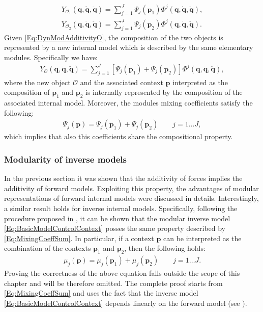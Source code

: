 \documentclass{svmult}
\begin{document}
\begin{eqnarray} \label{Eq:DynModAdditivityComb}
Y_{\mathcal O_1}(\mathbf q, \dot{\mathbf q}, \ddot{\mathbf q}) = 
\sum_{j=1}^J \Psi_j(\mathbf p_1) \Phi^j(\mathbf q, \dot{\mathbf q},\ddot{\mathbf q}),\\
Y_{\mathcal O_2}(\mathbf q, \dot{\mathbf q}, \ddot{\mathbf q}) = 
\sum_{j=1}^J \Psi_j(\mathbf p_2) \Phi^j(\mathbf q, \dot{\mathbf q},
\ddot{\mathbf q}).
\end{eqnarray}
Given \eqref{Eq:DynModAdditivityO},
the composition of the two objects is represented by a new internal 
model which is described by the same elementary modules. Specifically  
we have:
\begin{eqnarray}
Y_{\mathcal O}(\mathbf q, \dot{\mathbf q}, \ddot{\mathbf q}) = 
\sum_{j=1}^J \left[\Psi_j(\mathbf p_1) + \Psi_j(\mathbf p_2) \right] \Phi^j(\mathbf q, \dot{\mathbf q},\ddot{\mathbf q}),
\end{eqnarray}
where the new object $\mathcal O$ and the associated context $\mathbf p$
interpreted as the composition of $\mathbf p_1$
and $\mathbf p_2$ is internally represented by the composition of the associated
internal model. Moreover, the modules mixing coefficients satisfy the following:
\begin{eqnarray} \label{Eq:MixingCoeffSum}
\Psi_j(\mathbf p) = \Psi_j(\mathbf p_1) + \Psi_j(\mathbf p_2) \qquad j = 1 \dots J,
\end{eqnarray}
which implies that also this coefficients share the compositional property.

\subsubsection{Modularity of inverse models}

In the previous section it was shown that the additivity of 
forces implies the additivity of forward models. Exploiting 
this property, the advantages of modular representations of forward internal 
models were discussed in details. Interestingly, a similar result holds for 
inverse internal models. Specifically, following the procedure proposed
in \cite{NoriBiolCyb2005}, it can be shown that the modular inverse model 
\eqref{Eq:BasicModelControlContext} posses the same property described by 
\eqref{Eq:MixingCoeffSum}. In particular, if a context $\mathbf p$ can be 
interpreted as the combination of the contexts $\mathbf p_1$ and $\mathbf p_2$,
then the following holds:
\begin{eqnarray} \label{Eq:MixingCoeffMu}
\mu_j(\mathbf p) = \mu_j(\mathbf p_1) + \mu_j(\mathbf p_2) \qquad j = 1 \dots J.
\end{eqnarray}
Proving the correctness of the above equation falls outside the scope of this 
chapter and will be therefore omitted. The complete proof starts from 
\eqref{Eq:MixingCoeffSum} and uses the fact that the inverse model 
\eqref{Eq:BasicModelControlContext} depends linearly on the 
forward model (see \cite{NoriBiolCyb2005, NoriPhDThesis}).
\end{document}
